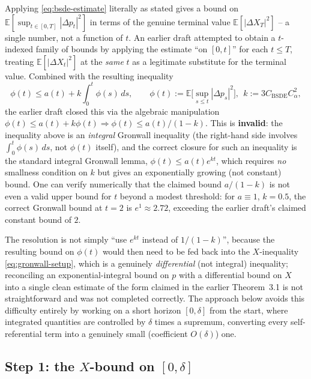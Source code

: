 \documentclass[11pt]{article}
\theoremstyle{remark}
\begin{document}
Applying \eqref{eq:bsde-estimate} literally as stated gives a bound on
$\mathbb{E}[\sup_{t\in[0,T]}|\Delta p_t|^2]$ in terms of the genuine terminal value
$\mathbb{E}[|\Delta X_T|^2]$ -- a single number, not a function of $t$. An earlier
draft attempted to obtain a $t$-indexed family of bounds by applying the estimate
``on $[0,t]$'' for each $t \le T$, treating $\mathbb{E}[|\Delta X_t|^2]$ at the
\emph{same} $t$ as a legitimate substitute for the terminal value. Combined with the
resulting inequality
\[
    \phi(t) \le a(t) + k\int_0^t \phi(s)\,ds, \qquad \phi(t) :=
    \mathbb{E}\Big[\sup_{s\le t}|\Delta p_s|^2\Big],\ \ k := 3C_{\mathrm{BSDE}}C_\alpha^2,
\]
the earlier draft closed this via the algebraic manipulation
$\phi(t) \le a(t) + k\phi(t) \Rightarrow \phi(t) \le a(t)/(1-k)$. This is
\textbf{invalid}: the inequality above is an \emph{integral} Gronwall inequality
(the right-hand side involves $\int_0^t \phi(s)\,ds$, not $\phi(t)$ itself), and the
correct closure for such an inequality is the standard integral Gronwall lemma,
$\phi(t) \le a(t)e^{kt}$, which requires \emph{no} smallness condition on $k$ but
gives an exponentially growing (not constant) bound. One can verify numerically that
the claimed bound $a/(1-k)$ is not even a valid upper bound for $t$ beyond a modest
threshold: for $a\equiv 1$, $k=0.5$, the correct Gronwall bound at $t=2$ is
$e^{1} \approx 2.72$, exceeding the earlier draft's claimed constant bound of $2$.

The resolution is not simply ``use $e^{kt}$ instead of $1/(1-k)$'', because the
resulting bound on $\phi(t)$ would then need to be fed back into the $X$-inequality
\eqref{eq:gronwall-setup}, which is a genuinely \emph{differential} (not integral)
inequality; reconciling an exponential-integral bound on $p$ with a differential
bound on $X$ into a single clean estimate of the form claimed in the earlier
Theorem~3.1 is not straightforward and was not completed correctly. The approach
below avoids this difficulty entirely by working on a short horizon $[0,\delta]$
from the start, where integrated quantities are controlled by $\delta$ times a
supremum, converting every self-referential term into a genuinely small
(coefficient $O(\delta)$) one.

\subsection{Step 1: the $X$-bound on $[0,\delta]$}
\end{document}
